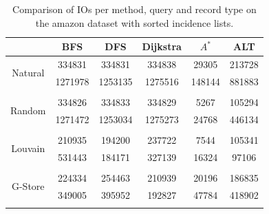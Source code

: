 \begin{table}[H]
	\begin{center}
		 \begin{tabular}[c]{c c c c c c} \toprule
			  & BFS & DFS & Dijkstra & $A^*$  & ALT \\ \midrule 
 			\multirow{2}{*}{Natural}  & 334831 & 334831 & 334838 & 29305 & 213728 \\ 
 				 & 1271978 & 1253135 & 1275516 & 148144 & 881883 \\ 
 				&&&&& \\[-0.5em]
 			\multirow{2}{*}{Random}  & 334826 & 334833 & 334829 & 5267 & 105294 \\ 
 				 & 1271472 & 1253034 & 1275273 & 24768 & 446134 \\ 
 				&&&&& \\[-0.5em]
 			\multirow{2}{*}{Louvain}  & 210935 & 194200 & 237722 & 7544 & 105341 \\ 
 				 & 531443 & 184171 & 327139 & 16324 & 97106 \\ 
 				&&&&& \\[-0.5em]
 			\multirow{2}{*}{G-Store}  & 224334 & 254463 & 210939 & 20196 & 186835 \\ 
 				 & 349005 & 395952 & 192827 & 47784 & 418902 \\ 
 				&&&&& \\[-0.5em]
 					\end{tabular}  
  	 \end{center}
	 \caption{Comparison of IOs per method, query and record type on the amazon dataset with sorted incidence lists.}
	 \label{amazon-s}
\end{table}

